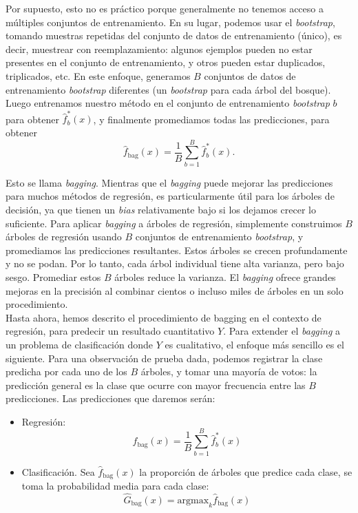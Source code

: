 Por supuesto, esto no es práctico porque generalmente no tenemos acceso a múltiples conjuntos de entrenamiento. En su lugar, podemos usar el \textit{bootstrap}, tomando muestras repetidas del conjunto de datos de entrenamiento (único), es decir, muestrear con reemplazamiento: algunos ejemplos pueden no estar presentes en el conjunto de entrenamiento, y otros pueden estar duplicados, triplicados, etc. En este enfoque, generamos $B$ conjuntos de datos de entrenamiento \textit{bootstrap} diferentes (un \textit{bootstrap} para cada árbol del bosque). Luego entrenamos nuestro método en el conjunto de entrenamiento \textit{bootstrap} $b$ para obtener $\hat{f}^*_b(x)$, y finalmente promediamos todas las predicciones, para obtener
\begin{equation}
\hat{f}_{\text{bag}}(x) = \frac{1}{B} \sum_{b=1}^{B} \hat{f}^*_b(x).
\end{equation}

Esto se llama \textit{bagging}. Mientras que el \textit{bagging} puede mejorar las predicciones para muchos métodos de regresión, es particularmente útil para los árboles de decisión, ya que tienen un \textit{bias} relativamente bajo si los dejamos crecer lo suficiente. Para aplicar \textit{bagging} a árboles de regresión, simplemente construimos $B$ árboles de regresión usando $B$ conjuntos de entrenamiento \textit{bootstrap}, y promediamos las predicciones resultantes. Estos árboles se crecen profundamente y no se podan. Por lo tanto, cada árbol individual tiene alta varianza, pero bajo sesgo. Promediar estos $B$ árboles reduce la varianza. El \textit{bagging} ofrece grandes mejoras en la precisión al combinar cientos o incluso miles de árboles en un solo procedimiento. \\

Hasta ahora, hemos descrito el procedimiento de bagging en el contexto de regresión, para predecir un resultado cuantitativo $Y$. Para extender el \textit{bagging} a un problema de clasificación donde $Y$ es cualitativo, el enfoque más sencillo es el siguiente. Para una observación de prueba dada, podemos registrar la clase predicha por cada uno de los $B$ árboles, y tomar una mayoría de votos: la predicción general es la clase que ocurre con mayor frecuencia entre las $B$ predicciones. Las predicciones que daremos serán: 
\begin{itemize}
\item Regresión: 
\begin{equation}
\hat{f}_{\text{bag}}(x) = \frac{1}{B} \sum_{b=1}^{B} \hat{f}^*_b(x)
\end{equation}
\item Clasificación. Sea $\hat{f}_{\text{bag}} (x)$ la proporción de árboles que predice cada clase, se toma la probabilidad media para cada clase:
\begin{equation}
\hat{G}_{\text{bag}}(x) = \text{argmax}_k \hat{f}_{\text{bag}} (x)
\end{equation}
\end{itemize}

